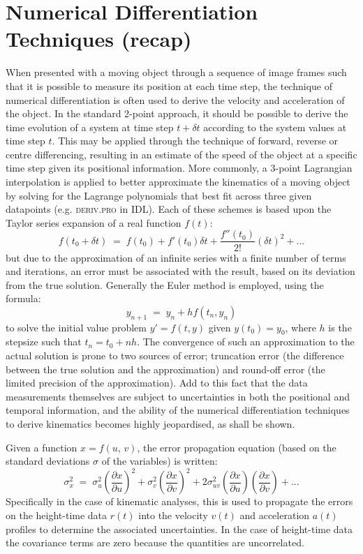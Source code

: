 \documentclass[preprint2]{aastex}
\begin{document}
\section{Numerical Differentiation Techniques (recap)}
When presented with a moving object through a sequence of image frames such that it is possible to measure its position at each time step, the technique of numerical differentiation is often used to derive the velocity and acceleration of the object. In the standard 2-point approach, it should be possible to derive the time evolution of a system at time step $t+\delta t$ according to the system values at time step $t$. This may be applied through the technique of forward, reverse or centre differencing, resulting in an estimate of the speed of the object at a specific time step given its positional information. More commonly, a 3-point Lagrangian interpolation is applied to better approximate the kinematics of a moving object by solving for the Lagrange polynomials that best fit across three given datapoints (e.g. \textsc{deriv.pro} in IDL). Each of these schemes is based upon the Taylor series expansion of a real function $f(t)$:
\begin{equation}
\label{taylor1}
f(t_0+\delta t) \; = \; f(t_0)+f'(t_0)\delta t +  \frac{f''(t_0)}{2!}(\delta t)^{2}  + ...
\end{equation}
but due to the approximation of an infinite series with a finite number of terms and iterations, an error must be associated with the result, based on its deviation from the true solution. Generally the Euler method is employed, using the formula:
\begin{equation}
y_{n+1} \; = \; y_n + h f(t_n, y_n)
\end{equation}
to solve the initial value problem $y'=f(t,y)$ given $y(t_0)=y_0$, where $h$ is the stepsize such that $t_n=t_0+nh$. The convergence of such an approximation to the actual solution is prone to two sources of error; truncation error (the difference between the true solution and the approximation) and round-off error (the limited precision of the approximation). Add to this fact that the data measurements themselves are subject to uncertainties in both the positional and temporal information, and the ability of the numerical differentiation techniques to derive kinematics becomes highly jeopardised, as shall be shown.

Given a function $x=f(u,\,v)$, the error propagation equation (based on the standard deviations $\sigma$ of the variables) is written:
\begin{equation}
\label{eqn_errorprop}
\sigma_x^2 \; = \; \sigma_u^2 \left(\frac{\partial x}{\partial u}\right) ^2 + \sigma_v^2 \left( \frac{\partial x}{\partial v} \right) ^2 + 2 \sigma_{uv}^2 \left( \frac{\partial x}{\partial u} \right) \left( \frac{\partial x}{\partial v} \right) + ...
\end{equation}
Specifically in the case of kinematic analyses, this is used to propagate the errors on the height-time data $r(t)$ into the velocity $v(t)$ and acceleration $a(t)$ profiles to determine the associated uncertainties. In the case of height-time data the covariance terms are zero because the quantities are uncorrelated.
\end{document}
